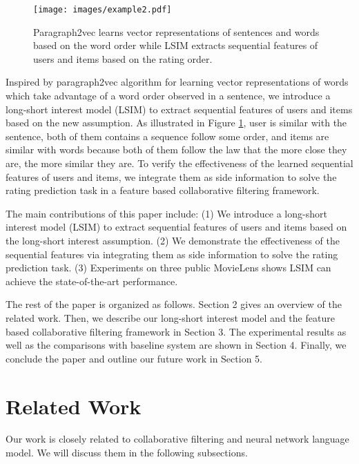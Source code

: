 \documentclass{sig-alternate-05-2015}
\begin{document}
\begin{figure}[htbp]
    \centering
    \texttt{[image: images/example2.pdf]}
    \caption{Paragraph2vec learns vector representations of sentences and words
    based on the word order
    while LSIM extracts sequential features of users and items
    based on the rating order.
    }
    \label{fig:example2}
\end{figure}

Inspired by paragraph2vec algorithm \cite{le2014distributed} for
learning vector representations of words which take advantage of
a word order observed in a sentence,
we introduce a long-short interest model (LSIM) to extract sequential features
of users and items based on the new assumption.
As illustrated in Figure \ref{fig:example2}, user is similar with the sentence,
both of them contains a sequence follow some order,
and items are similar with words because both of them follow the law
that the more close they are, the more similar they are.
To verify the effectiveness of the learned sequential features of users
and items, we integrate them as side information to solve the rating prediction task
in a feature based collaborative filtering framework.

The main contributions of this paper include:
(1) We introduce a long-short interest model (LSIM) to extract sequential features
of users and items based on the long-short interest assumption.
(2) We demonstrate the effectiveness of the sequential features
via integrating them as side information to solve the rating prediction task.
(3) Experiments on three public MovieLens shows LSIM can achieve the state-of-the-art performance.

The rest of the paper is organized as follows. Section 2 gives an overview of the related work.
Then, we describe our long-short interest model and the feature based collaborative filtering
framework in Section 3. The experimental results as well as the comparisons with
baseline system are shown in Section 4.
Finally, we conclude the paper and outline our future work in Section 5.

\section{Related Work}
Our work is closely related to collaborative filtering and
neural network language model.
We will discuss them in the following subsections.
\end{document}
